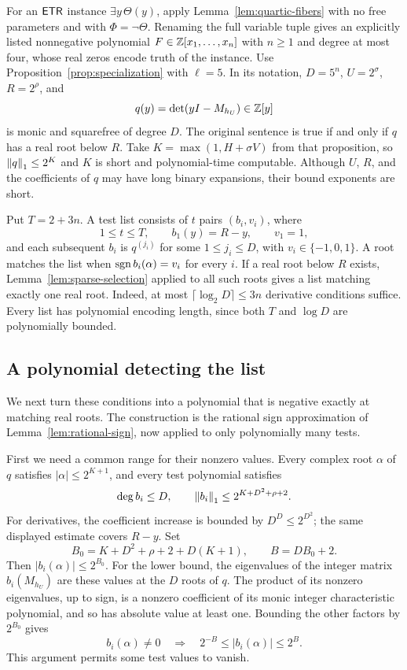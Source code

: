 For an $\mathsf{ETR}$ instance $\exists y\,\Theta(y)$, apply
Lemma~\ref{lem:quartic-fibers} with no free parameters and with
$\Phi=\neg\Theta$.  Renaming the full variable tuple gives an explicitly
listed nonnegative polynomial $F\in\mathbb Z[x_1,\ldots,x_n]$ with
$n\ge1$ and degree at most four, whose real zeros encode truth of
the instance.
Use Proposition~\ref{prop:specialization} with $\ell=5$.
In its notation, $D=5^n$, $U=2^\sigma$, $R=2^\rho$, and
\[
 q(y)=\det(yI-M_{h_U})\in\mathbb Z[y]
\]
is monic and squarefree of degree $D$.  The original sentence is true
if and only if $q$ has a real root below $R$.
Take $K=\max(1,H+\sigma V)$ from that proposition, so
$\left\lVert q\right\rVert_1\le2^K$ and $K$ is short and polynomial-time computable.
Although $U$, $R$, and the coefficients
of $q$ may have long binary expansions, their bound exponents are short.

Put $T=2+3n$.  A test list consists of $t$ pairs $(b_i,v_i)$, where
\[
 1\le t\le T,\qquad b_1(y)=R-y,\qquad v_1=1,
\]
and each subsequent $b_i$ is $q^{(j_i)}$ for some $1\le j_i\le D$,
with $v_i\in\{-1,0,1\}$.  A root matches the list when
$\operatorname{sgn} b_i(\alpha)=v_i$ for every $i$.  If a real root below $R$
exists, Lemma~\ref{lem:sparse-selection} applied to all such roots
gives a list matching exactly one real root.  Indeed, at most
$\lceil\log_2D\rceil\le3n$ derivative conditions suffice.
Every list has polynomial encoding length, since both $T$ and
$\log D$ are polynomially bounded.

\subsection{A polynomial detecting the list}

We next turn these conditions into a polynomial that is negative exactly
at matching real roots.  The construction is the rational sign
approximation of Lemma~\ref{lem:rational-sign}, now applied to only
polynomially many tests.

First we need a common range for their nonzero values.
Every complex root $\alpha$ of $q$ satisfies $|\alpha|\le2^{K+1}$,
and every test polynomial satisfies
\[
 \deg b_i\le D,
 \qquad \left\lVert b_i\right\rVert_1\le2^{K+D^2+\rho+2}.
\]
For derivatives, the coefficient increase is bounded by
$D^D\le2^{D^2}$; the same displayed estimate covers $R-y$.
Set
\begin{equation}\label{eq:sparse-value-bounds}
 B_0=K+D^2+\rho+2+D(K+1),\qquad B=DB_0+2.
\end{equation}
Then $|b_i(\alpha)|\le2^{B_0}$.
For the lower bound, the eigenvalues of the integer matrix
$b_i(M_{h_U})$ are these values at the $D$ roots of $q$.
The product of its nonzero eigenvalues, up to sign, is a nonzero
coefficient of its monic integer characteristic polynomial, and so
has absolute value at least one.  Bounding the other factors by
$2^{B_0}$ gives
\begin{equation}\label{eq:sparse-value-range}
 b_i(\alpha)\ne0
 \quad\Longrightarrow\quad
 2^{-B}\le |b_i(\alpha)|\le2^B.
\end{equation}
This argument permits some test values to vanish.

